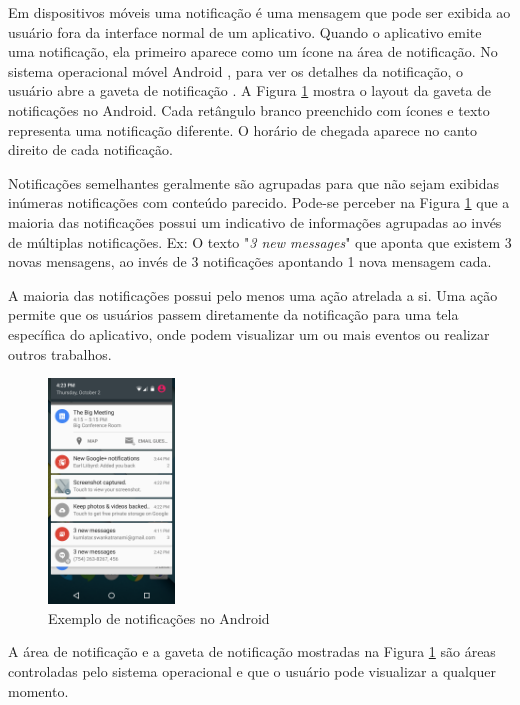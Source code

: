 Em dispositivos móveis uma notificação é uma mensagem que pode ser exibida ao usuário fora da interface normal de um aplicativo.
Quando o aplicativo emite uma notificação, ela primeiro aparece como um ícone na área de notificação. No sistema operacional móvel
Android \cite{android}, para ver os detalhes da notificação, o usuário abre a gaveta de notificação \cite{notificationDrawer}. A Figura
\ref{notification-drawer} mostra o layout da gaveta de notificações no Android. Cada retângulo branco preenchido com ícones
e texto representa uma notificação diferente. O horário de chegada aparece no canto direito de cada notificação.

Notificações semelhantes geralmente são agrupadas para que não sejam exibidas inúmeras notificações com conteúdo parecido.
Pode-se perceber na Figura \ref{notification-drawer} que a maioria das notificações possui um indicativo de informações agrupadas
ao invés de múltiplas notificações. Ex: O texto "\textit{3 new messages}" que aponta que existem 3 novas mensagens, ao invés de 3
notificações apontando 1 nova mensagem cada.

A maioria das notificações possui pelo menos uma ação atrelada a si. Uma ação permite que os usuários passem
diretamente da notificação para uma tela específica do aplicativo, onde podem visualizar um ou mais eventos ou realizar
outros trabalhos.

\begin{figure}[h]
\centering
\includegraphics[width=0.3\textwidth]{images/notification_drawer.png}
\caption{Exemplo de notificações no Android \cite{notificationDrawer}}
\label{notification-drawer}
\end{figure}

A área de notificação e a gaveta de notificação mostradas na Figura \ref{notification-drawer} são áreas controladas pelo
sistema operacional e que o usuário pode visualizar a qualquer momento.

